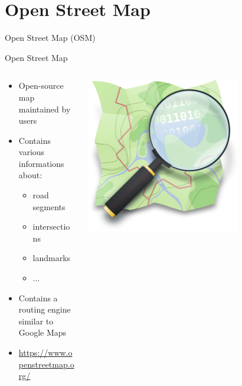 \documentclass[aspectratio=169]{beamer}
\begin{document}
\section{Open Street Map}
\begin{frame}{Open Street Map (OSM) \cite{haklay2008openstreetmap}}

\begin{center}
{\LARGE Open Street Map}
\end{center}

\begin{columns}
\begin{column}{0.5\textwidth}
	
	\begin{itemize}
		\item Open-source map maintained by users
		\item Contains various informations about:
		\begin{itemize}
			\item road segments
			\item intersections
			\item landmarks
			\item ...
		\end{itemize}
		\item Contains a routing engine similar to Google Maps 
		\item \url{https://www.openstreetmap.org/}
	\end{itemize}
\end{column}
\begin{column}{0.5\textwidth}  %
    \begin{center}
     \includegraphics[width=0.7\textwidth]{figures/osm_logo.png}
     \end{center}
\end{column}
\end{columns}
\end{frame}
\end{document}
